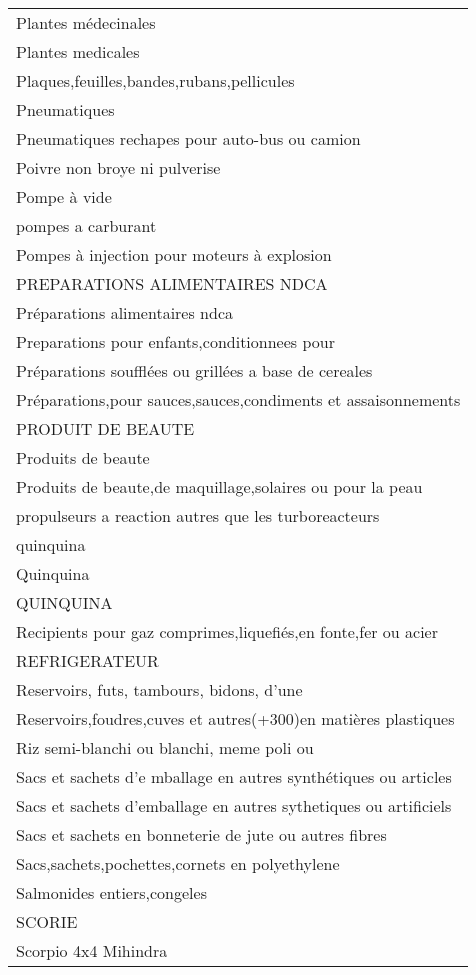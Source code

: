 \documentclass[
]{book}
\begin{document}
\begin{longtable}[t]{l}
\addlinespace
Plantes médecinales\\
Plantes medicales\\
Plaques,feuilles,bandes,rubans,pellicules\\
Pneumatiques\\
Pneumatiques rechapes pour auto-bus ou camion\\
\addlinespace
Poivre non broye ni pulverise\\
Pompe à vide\\
pompes a carburant\\
Pompes à injection pour moteurs à explosion\\
PREPARATIONS ALIMENTAIRES NDCA\\
\addlinespace
Préparations alimentaires ndca\\
Preparations pour enfants,conditionnees pour\\
Préparations soufflées ou grillées a base de cereales\\
Préparations,pour sauces,sauces,condiments et assaisonnements\\
PRODUIT DE BEAUTE\\
\addlinespace
Produits de beaute\\
Produits de beaute,de maquillage,solaires ou pour la peau\\
propulseurs a reaction autres que les turboreacteurs\\
quinquina\\
Quinquina\\
\addlinespace
QUINQUINA\\
Recipients pour gaz comprimes,liquefiés,en fonte,fer ou acier\\
REFRIGERATEUR\\
Reservoirs, futs, tambours, bidons, d'une\\
Reservoirs,foudres,cuves et autres(+300)en matières plastiques\\
\addlinespace
Riz semi-blanchi ou blanchi, meme poli ou\\
Sacs et sachets d'e mballage en autres synthétiques ou articles\\
Sacs et sachets d'emballage en autres sythetiques ou artificiels\\
Sacs et sachets en bonneterie de jute ou autres fibres\\
Sacs,sachets,pochettes,cornets en polyethylene\\
\addlinespace
Salmonides entiers,congeles\\
SCORIE\\
Scorpio 4x4 Mihindra\\

\end{longtable}
\end{document}
